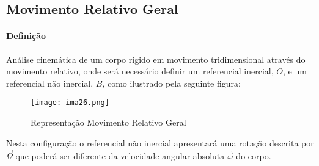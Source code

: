 \documentclass{article}
\begin{document}
        \subsection{Movimento Relativo Geral}
            \paragraph{Definição}Análise cinemática de um corpo rígido em movimento tridimensional através do movimento relativo, onde será necessário definir um referencial inercial, $O$, e um referencial não inercial, $B$, como ilustrado pela seguinte figura:
                \begin{figure}[H]
                    \centering
                    \texttt{[image: ima26.png]}
                    \caption{Representação Movimento Relativo Geral}
                \end{figure}\noindent
            Nesta configuração o referencial não inercial apresentará uma rotação descrita por $\vec{\Omega}$ que poderá ser diferente da velocidade angular absoluta $\vec{\omega}$ do corpo.
\end{document}
